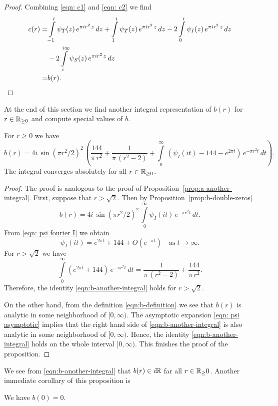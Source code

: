 \begin{proof}
Combining \eqref{eqn: c1} and \eqref{eqn: c2} we find
\begin{align}c(r)=&\int\limits_{-1}^{i}\psi_T(z)\,e^{\pi i r^2 \,z}\,dz+\int\limits_{1}^{i}\psi_T(z)\,e^{\pi i r^2 \,z}\,dz
-2\int\limits_{0}^{i}\psi_I(z)\,e^{\pi i r^2 \,z}\,dz\notag\\
&-2\int\limits_{i}^{i\infty}\psi_S(z)\,e^{\pi i r^2 \,z}\,dz\notag\\
=&b(r).\notag
    \end{align}
\end{proof}
At the end of this section we find another integral representation of $b(r)$ for $r\in\mathbb{R}_{\geq0}$ and compute special values of $b$.

\begin{proposition}\label{prop:b-another-integral}
For $r\geq0$ we have
\begin{equation}\label{eqn:b-another-integral}b(r)=4i\,\sin(\pi r^2/2)^2\,\left(\frac{144}{\pi\,r^2}+\frac{1}{\pi\,(r^2-2)}+\int\limits_0^\infty\,\left(\psi_I(it)-144-e^{2\pi t}\right)\,e^{-\pi r^2 t}\,dt\right).\end{equation}
The integral converges absolutely for all $r\in\mathbb{R}_{\geq 0}$.
\end{proposition}
\begin{proof}
The proof is analogous to the proof of Proposition~\ref{prop:a-another-integral}.
First, suppose that $r>\sqrt{2}$. Then by Proposition~\ref{prop:b-double-zeros}
$$b(r)=4i\,\sin(\pi r^2/2)^2\,\int\limits_{0}^{\infty}\psi_I(it)\,e^{-\pi r^2 t}\,dt. $$
From \eqref{eqn: psi fourier I} we obtain
\begin{equation}\label{eqn: psi asymptotic}
\psi_I(it)=e^{2\pi t}+144+O(e^{-\pi t})\quad\mbox{as}\;t\to\infty.
\end{equation}
For $r>\sqrt{2}$ we have
\begin{equation}
\int\limits_0^\infty \left(e^{2\pi t}+144\right)\,e^{-\pi r^2 t}\,dt
=\frac{1}{\pi\,(r^2-2)}+\frac{144}{\pi\,r^2}.\end{equation}
Therefore, the identity \eqref{eqn:b-another-integral} holds for $r>\sqrt{2}$.

On the other hand, from the definition \eqref{eqn:b-definition} we see that $b(r)$ is analytic in some neighborhood of $[0,\infty)$. The asymptotic expansion \eqref{eqn: psi asymptotic} implies that the right hand side of \eqref{eqn:b-another-integral} is also analytic in some neighborhood of $[0,\infty)$. Hence, the identity \eqref{eqn:b-another-integral} holds on the whole interval $[0,\infty)$. This finishes the proof of the proposition.
\end{proof}
We see from \eqref{eqn:b-another-integral} that $b(r)\in i\mathbb{R}$ far all $r\in\mathbb{R}_\geq{0}$.
Another immediate corollary of this proposition is

\begin{proposition}\label{prop:b0}
We have $b(0) = 0$.
\end{proposition}
